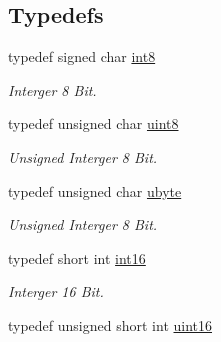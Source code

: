 \subsection*{Typedefs}
\begin{DoxyCompactItemize}
\item 
\hypertarget{namespace_f2_c_afe0bd5c32b87b6cbd7766ebb2498cf5f}{
typedef signed char \hyperlink{namespace_f2_c_afe0bd5c32b87b6cbd7766ebb2498cf5f}{int8}}
\label{namespace_f2_c_afe0bd5c32b87b6cbd7766ebb2498cf5f}

\begin{DoxyCompactList}\small\item\em Interger 8 Bit. \item\end{DoxyCompactList}\item 
\hypertarget{namespace_f2_c_a711deb33697d145669b9c0c4fe87c7ca}{
typedef unsigned char \hyperlink{namespace_f2_c_a711deb33697d145669b9c0c4fe87c7ca}{uint8}}
\label{namespace_f2_c_a711deb33697d145669b9c0c4fe87c7ca}

\begin{DoxyCompactList}\small\item\em Unsigned Interger 8 Bit. \item\end{DoxyCompactList}\item 
\hypertarget{namespace_f2_c_a74fad364688add30796d711e5635ac77}{
typedef unsigned char \hyperlink{namespace_f2_c_a74fad364688add30796d711e5635ac77}{ubyte}}
\label{namespace_f2_c_a74fad364688add30796d711e5635ac77}

\begin{DoxyCompactList}\small\item\em Unsigned Interger 8 Bit. \item\end{DoxyCompactList}\item 
\hypertarget{namespace_f2_c_ab83c1e14d784a7d520d770ca6fa8fd8e}{
typedef short int \hyperlink{namespace_f2_c_ab83c1e14d784a7d520d770ca6fa8fd8e}{int16}}
\label{namespace_f2_c_ab83c1e14d784a7d520d770ca6fa8fd8e}

\begin{DoxyCompactList}\small\item\em Interger 16 Bit. \item\end{DoxyCompactList}\item 
\hypertarget{namespace_f2_c_a2d95c3c3eebf9e41f34363393100d0b4}{
typedef unsigned short int \hyperlink{namespace_f2_c_a2d95c3c3eebf9e41f34363393100d0b4}{uint16}}
\label{namespace_f2_c_a2d95c3c3eebf9e41f34363393100d0b4}


\end{DoxyCompactItemize}
